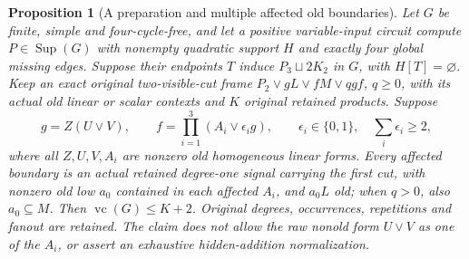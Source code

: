 \documentclass[11pt]{article}
\newcommand{\Sup}{\operatorname{Sup}}
\newcommand{\vc}{\operatorname{vc}}
\newtheorem{proposition}[theorem]{Proposition}
\theoremstyle{definition}
\theoremstyle{remark}
\begin{document}
\begin{proposition}[A preparation and multiple affected old boundaries]\label{prop:pathmultipleaffected}
Let $G$ be finite, simple and four-cycle-free, and let a positive variable-input circuit compute $P\in\Sup(G)$ with nonempty quadratic support $H$ and exactly four global missing edges. Suppose their endpoints $T$ induce $P_3\sqcup2K_2$ in $G$, with $H[T]=\varnothing$. Keep an exact original two-visible-cut frame $P_2\vee gL\vee fM\vee qgf$, $q\ge0$, with its actual old linear or scalar contexts and $K$ original retained products. Suppose
\[
 g=Z(U\vee V),\qquad f=\prod_{i=1}^3(A_i\vee\epsilon_i g),
 \qquad\epsilon_i\in\{0,1\},\quad\sum_i\epsilon_i\ge2,
\]
where all $Z,U,V,A_i$ are nonzero old homogeneous linear forms. Every affected boundary is an actual retained degree-one signal carrying the first cut, with nonzero old low $a_0$ contained in each affected $A_i$, and $a_0L$ old; when $q>0$, also $a_0\subseteq M$. Then $\vc(G)\le K+2$. Original degrees, occurrences, repetitions and fanout are retained. The claim does not allow the raw nonold form $U\vee V$ as one of the $A_i$, or assert an exhaustive hidden-addition normalization.
\end{proposition}
\end{document}
